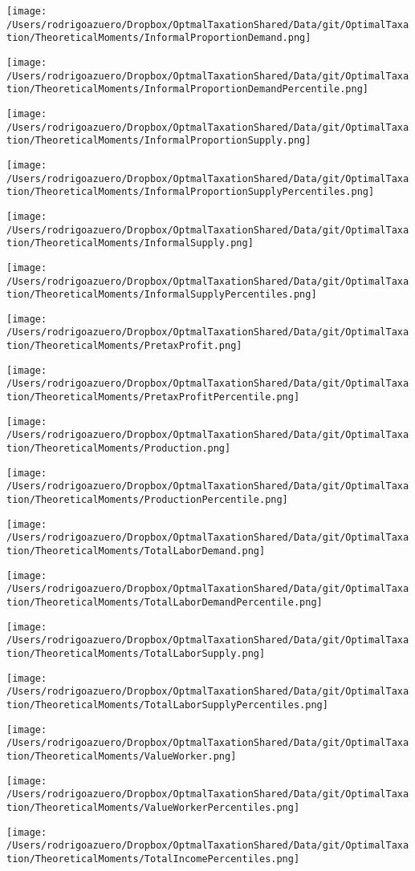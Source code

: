 \documentclass[12pt]{article}
\begin{document}
\texttt{[image: /Users/rodrigoazuero/Dropbox/OptmalTaxationShared/Data/git/OptimalTaxation/TheoreticalMoments/InformalProportionDemand.png]}

\texttt{[image: /Users/rodrigoazuero/Dropbox/OptmalTaxationShared/Data/git/OptimalTaxation/TheoreticalMoments/InformalProportionDemandPercentile.png]}

\texttt{[image: /Users/rodrigoazuero/Dropbox/OptmalTaxationShared/Data/git/OptimalTaxation/TheoreticalMoments/InformalProportionSupply.png]}

\texttt{[image: /Users/rodrigoazuero/Dropbox/OptmalTaxationShared/Data/git/OptimalTaxation/TheoreticalMoments/InformalProportionSupplyPercentiles.png]}

\texttt{[image: /Users/rodrigoazuero/Dropbox/OptmalTaxationShared/Data/git/OptimalTaxation/TheoreticalMoments/InformalSupply.png]}

\texttt{[image: /Users/rodrigoazuero/Dropbox/OptmalTaxationShared/Data/git/OptimalTaxation/TheoreticalMoments/InformalSupplyPercentiles.png]}

\texttt{[image: /Users/rodrigoazuero/Dropbox/OptmalTaxationShared/Data/git/OptimalTaxation/TheoreticalMoments/PretaxProfit.png]}

\texttt{[image: /Users/rodrigoazuero/Dropbox/OptmalTaxationShared/Data/git/OptimalTaxation/TheoreticalMoments/PretaxProfitPercentile.png]}

\texttt{[image: /Users/rodrigoazuero/Dropbox/OptmalTaxationShared/Data/git/OptimalTaxation/TheoreticalMoments/Production.png]}

\texttt{[image: /Users/rodrigoazuero/Dropbox/OptmalTaxationShared/Data/git/OptimalTaxation/TheoreticalMoments/ProductionPercentile.png]}

\texttt{[image: /Users/rodrigoazuero/Dropbox/OptmalTaxationShared/Data/git/OptimalTaxation/TheoreticalMoments/TotalLaborDemand.png]}

\texttt{[image: /Users/rodrigoazuero/Dropbox/OptmalTaxationShared/Data/git/OptimalTaxation/TheoreticalMoments/TotalLaborDemandPercentile.png]}

\texttt{[image: /Users/rodrigoazuero/Dropbox/OptmalTaxationShared/Data/git/OptimalTaxation/TheoreticalMoments/TotalLaborSupply.png]}

\texttt{[image: /Users/rodrigoazuero/Dropbox/OptmalTaxationShared/Data/git/OptimalTaxation/TheoreticalMoments/TotalLaborSupplyPercentiles.png]}

\texttt{[image: /Users/rodrigoazuero/Dropbox/OptmalTaxationShared/Data/git/OptimalTaxation/TheoreticalMoments/ValueWorker.png]}

\texttt{[image: /Users/rodrigoazuero/Dropbox/OptmalTaxationShared/Data/git/OptimalTaxation/TheoreticalMoments/ValueWorkerPercentiles.png]}

\texttt{[image: /Users/rodrigoazuero/Dropbox/OptmalTaxationShared/Data/git/OptimalTaxation/TheoreticalMoments/TotalIncomePercentiles.png]}
\end{document}
